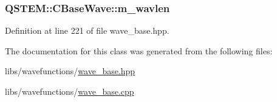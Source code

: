 \hypertarget{class_q_s_t_e_m_1_1_c_base_wave_a31b10df75fb84217c8b853386a72efb1}{
\subsubsection[{m\-\_\-wavlen}]{ Q\-S\-T\-E\-M\-::\-C\-Base\-Wave\-::m\-\_\-wavlen\hspace{0.3cm}{\ttfamily [protected]}}}\label{class_q_s_t_e_m_1_1_c_base_wave_a31b10df75fb84217c8b853386a72efb1}


Definition at line 221 of file wave\-\_\-base.\-hpp.



The documentation for this class was generated from the following files\-:\begin{DoxyCompactItemize}
\item 
libs/wavefunctions/\hyperlink{wave__base_8hpp}{wave\-\_\-base.\-hpp}\item 
libs/wavefunctions/\hyperlink{wave__base_8cpp}{wave\-\_\-base.\-cpp}\end{DoxyCompactItemize}
